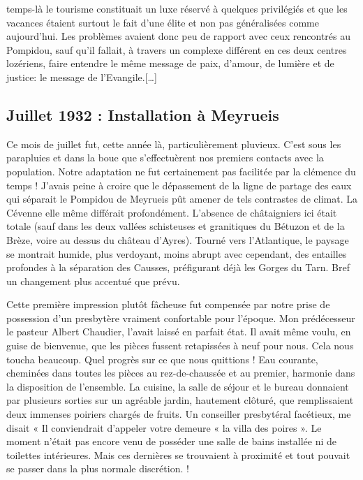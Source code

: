 
temps-là le tourisme constituait un luxe réservé à quelques privilégiés et que les
vacances étaient surtout le fait d’une élite et non pas généralisées comme aujourd’hui.
Les problèmes avaient donc peu de rapport avec ceux rencontrés au Pompidou, sauf
qu’il fallait, à travers un complexe différent en ces deux centres lozériens, faire
entendre le même message de paix, d’amour, de lumière et de justice: le message de
l’Evangile.[\ldots]

\subsection*{Juillet 1932 : Installation à Meyrueis}

Ce mois de juillet fut, cette année là, particulièrement pluvieux. C’est sous les
parapluies et dans la boue que s’effectuèrent nos premiers contacts avec la
population. Notre adaptation ne fut certainement pas facilitée par la clémence du
temps ! J’avais peine à croire que le dépassement de la ligne de partage des eaux qui
séparait le Pompidou de Meyrueis pût amener de tels contrastes de climat. La
Cévenne elle même différait profondément. L’absence de châtaigniers ici était totale
(sauf dans les deux vallées schisteuses et granitiques du Bétuzon et de la Brèze, voire au dessus du
château d’Ayres). Tourné vers l’Atlantique, le paysage se montrait humide, plus
verdoyant, moins abrupt avec cependant, des entailles profondes à la séparation des
Causses, préfigurant déjà les Gorges du Tarn. Bref un changement plus accentué que
prévu.

Cette première impression plutôt fâcheuse fut compensée par notre prise de
possession d’un presbytère vraiment confortable pour l’époque.
Mon prédécesseur le pasteur Albert Chaudier, l’avait laissé en parfait état. Il avait
même voulu, en guise de bienvenue, que les pièces fussent retapissées à neuf pour
nous. Cela nous toucha beaucoup. Quel progrès sur ce que nous quittions ! Eau
courante, cheminées dans toutes les pièces au rez-de-chaussée et au premier,
harmonie dans la disposition de l’ensemble. La cuisine, la salle de séjour et le bureau
donnaient par plusieurs sorties sur un agréable jardin, hautement clôturé, que
remplissaient deux immenses poiriers chargés de fruits. Un conseiller presbytéral
facétieux, me disait « Il conviendrait d’appeler votre demeure « la villa des poires ».
Le moment n’était pas encore venu de posséder une salle de bains installée ni de
toilettes intérieures. Mais ces dernières se trouvaient à proximité et tout pouvait se
passer dans la plus normale discrétion. !

